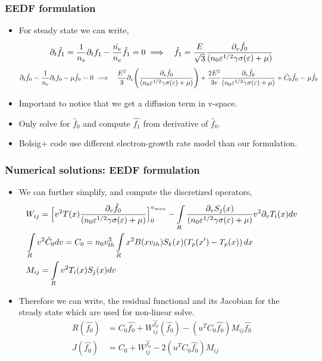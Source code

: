 \documentclass[mathserif, aspectratio=169]{beamer}
\newcommand{\of}[1]{\mleft( #1 \mright)}
\newcommand{\myint}{\int\limits}
\newcommand{\diff}[1]{\, d#1}
\begin{document}
\begin{frame}
	\frametitle{EEDF formulation}
	\begin{itemize}
		\item For steady state we can write, 
		\begin{align*}
			&\partial_t \hat{f_1} = \frac{1}{n_e} \partial_t f_1 - \frac{\dot{n_e}}{n_e} \hat{f_1} =0 \implies 
			&\hat{f_1} = \frac{E}{\sqrt{3}} \frac{\partial_{v}\hat{f_0}}{(n_0 \varepsilon^{1/2}\gamma \sigma\of{\varepsilon} + \mu)}
		\end{align*}
		\begin{align*}
			&\partial_t \hat{f_0} = \frac{1}{n_e} \partial_t f_0 - \mu \hat{f_0} = 0  \implies
			&\frac{E^2}{3} \partial_{v} \of{\frac{\partial_v \hat f_0}{(n_0 \varepsilon^{1/2}\gamma \sigma\of{\varepsilon} + \mu)}} + \frac{2E^2}{3v} \frac{\partial_v \hat{f_0}}{(n_0 \varepsilon^{1/2}\gamma \sigma\of{\varepsilon} + \mu)} + \tilde C_0 \hat{f_0} = \mu \hat{f_0}\\
		\end{align*}
		\item Important to notice that we get a diffusion term in v-space. 
		\item Only solve for $\hat{f}_0$ and compute $\hat{f_1}$ from derivative of $\hat{f}_0$.
		\item Bolsig+ code use different electron-growth rate model than our formulation. 
	\end{itemize}
\end{frame}

\begin{frame}
	\frametitle{Numerical solutions: EEDF formulation}
	\begin{itemize}
		\item We can further simplify, and compute the discretized operators, 
		{\tiny
		\begin{align*}
			&W_{ij} = \Big[v^2 T(x) \frac{\partial_v \hat f_0}{(n_0 \varepsilon^{1/2}\gamma \sigma\of{\varepsilon} + \mu)}\Big]_0^{v_{max}}-\myint_{R} \frac{\partial_v S_j(x)}{(n_0 \varepsilon^{1/2}\gamma \sigma\of{\varepsilon} + \mu)} v^2 \partial_v T_i(x) dv \\
			&\myint_{R} v^2 \tilde{C}_0 dv = C_{0}  = n_0 v_{th}^3 \myint_{R} x^2 B(x v_{th}) S_k\of{x}  \of{T_p\of{x^\prime} - T_p\of{x}} \diff{x}  \\
			&M_{ij} = \myint_{R} v^2 T_i(x) S_j(x) dv\\
		\end{align*}}
		\item Therefore we can write, the residual functional and its Jacobian for the steady state which are used for non-linear solve. 
		\begin{align*}
			R(\hat{f_0}) &= C_0 \hat{f_0} + W^{\hat{f_0}}_{ij} (\hat{f_0}) - (u^T C_0 \hat{f_0}) M_{ij} \hat{f_0} \\
			J(\hat{f_0}) &= C_0 + W^{\hat{f_0}}_{ij}  - 2(u^T C_0 \hat{f_0}) M_{ij}
		\end{align*}
	\end{itemize}
\end{frame}
\end{document}
